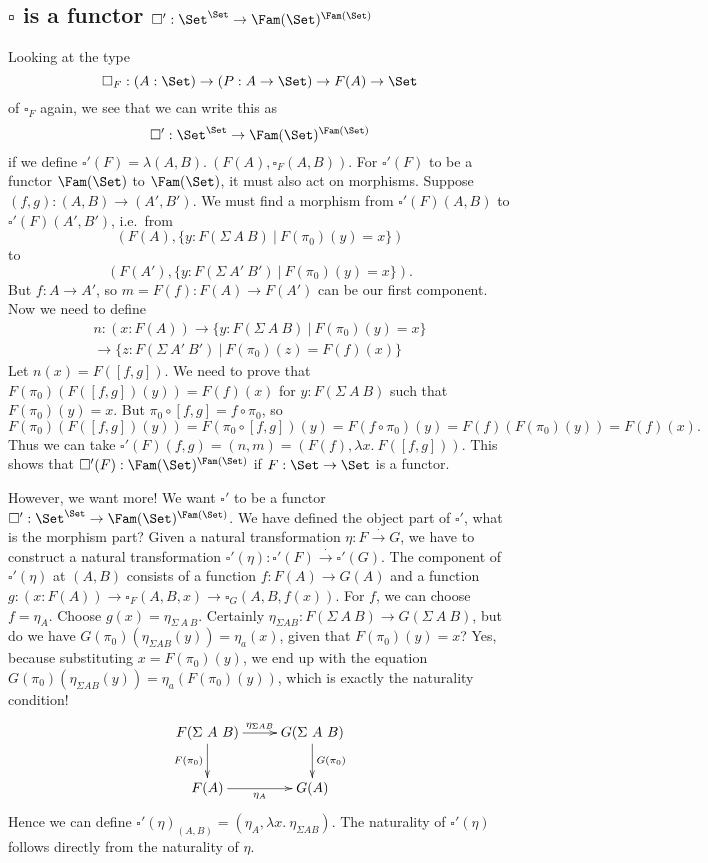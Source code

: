 \documentclass{article}
\begin{document}
\subsection{$\square$ is a functor $\square' : \Set^{\Set} \to \Fam(\Set)^{\Fam(\Set)}$}

Looking at the type 
\[
\square_F : (A : \Set) \to (P : A \to \Set) \to F(A) \to \Set
\]
of $\square_F$ again, we see that we can write this as
\[
\square' : \Set^{\Set} \to \Fam(\Set)^{\Fam(\Set)}
\]
if we define $\square'(F) = \lambda (A, B) .\ (F(A), \square_F(A,
B))$. For $\square'(F)$ to be a functor $\Fam(\Set)$ to $\Fam(\Set)$,
it must also act on morphisms. Suppose $(f, g) : (A, B) \to (A',
B')$. We must find a morphism from $\square'(F)(A, B)$ to
$\square'(F)(A', B')$, i.e.\ from
\[
(F(A),  \{ y : F(\Sigma\ A\ B)\ |\ F(\pi_0)(y) = x \})
\]
to
\[
(F(A'),  \{ y : F(\Sigma\ A'\ B')\ |\ F(\pi_0)(y) = x \}).
\]
But $f : A \to A'$, so $m = F(f) : F(A) \to F(A')$ can be our first
component. Now we need to define
\begin{multline*}
  n : (x : F(A)) \to \{ y : F(\Sigma\ A\ B)\ |\ F(\pi_0)(y) = x \} \\
  \to \{ z : F(\Sigma\ A'\ B')\ |\ F(\pi_0)(z) = F(f)(x) \}
\end{multline*}
Let $n(x) = F([f, g])$. We need to prove that $F(\pi_0)(F([f, g])(y))
= F(f)(x)$ for $y : F(\Sigma\ A\ B)$ such that $F(\pi_0)(y) = x$. But
$\pi_0 \circ [f, g] = f \circ \pi_0$, so
\[
F(\pi_0)(F([f, g])(y)) = F(\pi_0 \circ [f, g])(y) = F(f \circ
\pi_0)(y) = F(f)(F(\pi_0)(y)) = F(f)(x).
\]
Thus we can take $\square'(F)(f,g) = (n, m) = (F(f), \lambda x .\
F([f,g]))$. This shows that $\square'(F) : \Fam(\Set)^{\Fam(\Set)}$ if
$F : \Set \to \Set$ is a functor.

However, we want more! We want $\square'$ to be a functor $\square' :
\Set^{\Set} \to \Fam(\Set)^{\Fam(\Set)}$. We have defined the object
part of $\square'$, what is the morphism part? Given a natural
transformation $\eta : F \xrightarrow{\cdot} G$, we have to construct
a natural transformation $\square'(\eta) : \square'(F)
\xrightarrow{\cdot} \square'(G)$. The component of $\square'(\eta)$ at
$(A, B)$ consists of a function $f : F(A) \to G(A)$ and a function $g
: (x : F(A)) \to \square_F(A, B, x) \to \square_G(A, B, f(x))$. For
$f$, we can choose $f = \eta_A$. Choose $g(x) = \eta_{\Sigma\ A\
  B}$. Certainly $\eta_{\Sigma A B} : F(\Sigma\ A\ B) \to G(\Sigma\ A\
B)$, but do we have $G(\pi_0)(\eta_{\Sigma A B}(y)) = \eta_a(x)$,
given that $F(\pi_0)(y) = x$? Yes, because substituting $x =
F(\pi_0)(y)$, we end up with the equation $G(\pi_0)(\eta_{\Sigma A
  B}(y)) = \eta_a(F(\pi_0)(y))$, which is exactly the naturality
condition!
\[
\xymatrix
{
F(\Sigma\ A\ B) \ar^-{\eta_{\Sigma A B}}[r] \ar_{F(\pi_0)}[d] & G(\Sigma\ A\ B) \ar^{G(\pi_0)}[d] \\
F(A) \ar_-{\eta_{A}}[r] & G(A) 
}
\]
Hence we can define $\square'(\eta)_{(A, B)} = (\eta_A,
\lambda x .\ \eta_{\Sigma A B})$. The naturality of $\square'(\eta)$
follows directly from the naturality of $\eta$.
\end{document}
